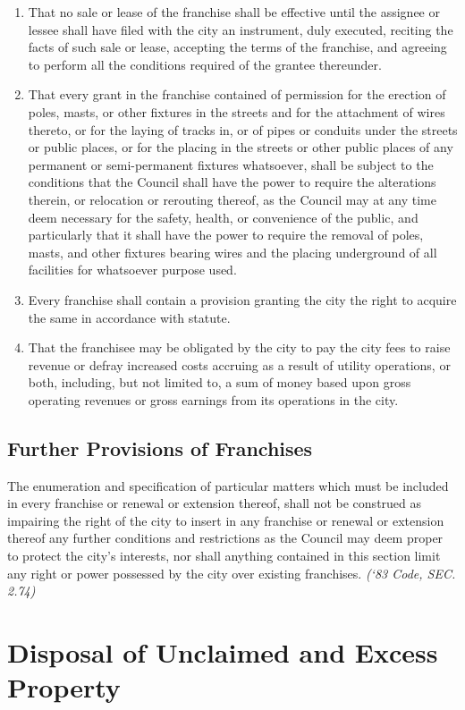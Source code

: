 \begin{enumerate}
\item That no sale or lease of the franchise shall be effective until the assignee or lessee shall have filed with the city an instrument, duly executed, reciting the facts of such sale or lease, accepting the terms of the franchise, and agreeing to perform all the conditions required of the grantee thereunder.
\item That every grant in the franchise contained of permission for the erection of poles, masts, or other fixtures in the streets and for the attachment of wires thereto, or for the laying of tracks in, or of pipes or conduits under the streets or public places, or for the placing in the streets or other public places of any permanent or semi-permanent fixtures whatsoever, shall be subject to the conditions that the Council shall have the power to require the alterations therein, or relocation or rerouting thereof, as the Council may at any time deem necessary for the safety, health, or convenience of the public, and particularly that it shall have the power to require the removal of poles, masts, and other fixtures bearing wires and the placing underground of all facilities for whatsoever purpose used.
\item Every franchise shall contain a provision granting the city the right to acquire the same in accordance with statute.
\item That the franchisee may be obligated by the city to pay the city fees to raise revenue or defray increased costs accruing as a result of utility operations, or both, including, but not limited to, a sum of money based upon gross operating revenues or gross earnings from its operations in the city.
\end{enumerate}
\subsection{Further Provisions of Franchises}
The enumeration and specification of particular matters which must be included in every franchise or renewal or extension thereof, shall not be construed as impairing the right of the city to insert in any franchise or renewal or extension thereof any further conditions and restrictions as the Council may deem proper to protect the city’s interests, nor shall anything contained in this section limit any right or power possessed by the city over existing franchises.\newline
\emph{(‘83 Code, SEC. 2.74)}

\section{Disposal of Unclaimed and Excess Property}
